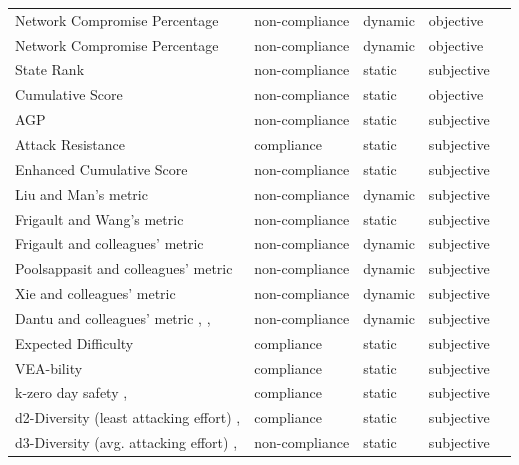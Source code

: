 \begin{tiny}
\begin{longtable}{@{}lllll@{}}
Network Compromise Percentage \cite{Lippmann_2006} &  non-compliance &  dynamic &  objective &  \\
Network Compromise Percentage \cite{Lippmann_2006} & non-compliance &  dynamic &  objective & \\
State Rank \cite{Mehta_Bartzis_Zhu_Clarke_Wing_2006} & non-compliance & static & subjective &  \\
Cumulative Score \cite{Noel_Jajodia} & non-compliance & static & objective &  \\
AGP \cite{Wang_Islam_Long_Singhal_Jajodia_2008} & non-compliance & static & subjective &  \\
Attack Resistance \cite{Wang_Singhal_Jajodia_2007a} & compliance & static & subjective &  \\
Enhanced Cumulative Score \cite{Homer_Zhang_Ou_Schmidt_Du_Rajagopalan_Singhal_2013} & non-compliance & static & subjective &  \\
Liu and Man’s metric \cite{Liu_Man_2005} & non-compliance & dynamic & subjective &  \\
Frigault and Wang’s metric \cite{Frigault_Wang_2008} & non-compliance & static & subjective &  \\
Frigault and colleagues’ metric \cite{Frigault_Wang_Singhal_Jajodia_2008} & non-compliance & dynamic & subjective &  \\
Poolsappasit and colleagues’ metric \cite{Poolsappasit_Dewri_Ray_2012} & non-compliance & dynamic & subjective &  \\
Xie and colleagues’ metric \cite{Xie_Li_Ou_Liu_Levy_2010} & non-compliance & dynamic & subjective &  \\
Dantu and colleagues’ metric \cite{Dantu_Kolan_Cangussu_2009}, \cite{Dantu_Kolan_2005}, \cite{Dantu_Loper_Kolan_2004} & non-compliance & dynamic & subjective &  \\
Expected Difficulty \cite{Ghosh_Bhattacharya_2012} & compliance & static & subjective &  \\
VEA-bility \cite{Tupper_Zincir-Heywood_2008} & compliance & static & subjective &  \\
k-zero day safety \cite{Wang_Jajodia_Singhal_Cheng_Noel_2014}, \cite{Wang_Jajodia_Singhal_Noel_2010} & compliance & static & subjective &  \\
d2-Diversity (least attacking effort) \cite{Zhang_Wang_Jajodia_Singhal_Albanese_2016}, \cite{Wang_Zhang_Jajodia_Singhal_Albanese_2014} & compliance & static & subjective &  \\
d3-Diversity (avg. attacking effort) \cite{Zhang_Wang_Jajodia_Singhal_Albanese_2016}, \cite{Wang_Zhang_Jajodia_Singhal_Albanese_2014} & non-compliance & static & subjective &  \\

\end{longtable}
\end{tiny}
